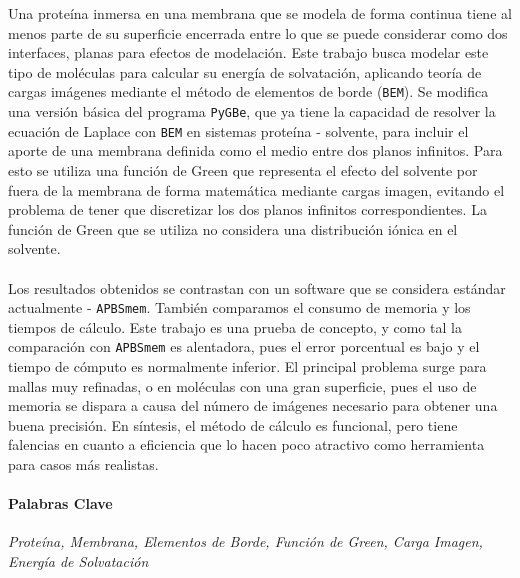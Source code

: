 \noindent
Una proteína inmersa en una membrana que se modela de forma continua tiene al menos parte de su superficie encerrada entre lo que se puede considerar como dos interfaces, planas para efectos de modelación. Este trabajo busca modelar este tipo de moléculas para calcular su energía de solvatación, aplicando teoría de cargas imágenes mediante el método de elementos de borde (\texttt{BEM}). Se modifica una versión básica del programa \texttt{PyGBe}, que ya tiene la capacidad de resolver la ecuación de Laplace con \texttt{BEM} en sistemas proteína - solvente, para incluir el aporte de una membrana definida como el medio entre dos planos infinitos. Para esto se utiliza una función de Green que representa el efecto del solvente por fuera de la membrana de forma matemática mediante cargas imagen, evitando el problema de tener que discretizar los dos planos infinitos correspondientes. La función de Green que se utiliza no considera una distribución iónica en el solvente.\\\\
Los resultados obtenidos se contrastan con un software que se considera estándar actualmente - \texttt{APBSmem}. También comparamos el consumo de memoria y los tiempos de cálculo. Este trabajo es una prueba de concepto, y como tal la comparación con \texttt{APBSmem} es alentadora, pues el error porcentual es bajo y el tiempo de cómputo es normalmente inferior. El principal problema surge para mallas muy refinadas, o en moléculas con una gran superficie, pues el uso de memoria se dispara a causa del número de imágenes necesario para obtener una buena precisión. En síntesis, el método de cálculo es funcional, pero tiene falencias en cuanto a eficiencia que lo hacen poco atractivo como herramienta para casos más realistas.

\paragraph{Palabras Clave} \textit{Proteína, Membrana, Elementos de Borde, Función de Green, Carga Imagen, Energía de Solvatación}